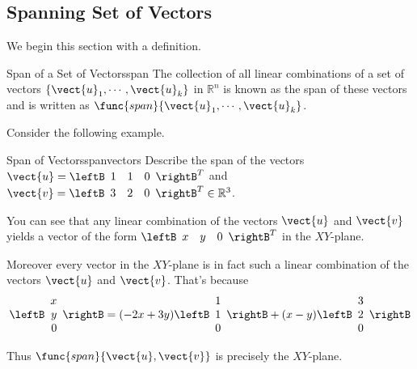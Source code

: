 \subsection{Spanning Set of Vectors}

We begin this section with a definition.

\begin{definition}{Span of a Set of Vectors}{span}
The collection of all linear combinations of a set of vectors $\{ \vect{u}_1,
\cdots ,\vect{u}_k\}$ in $\mathbb{R}^{n}$ is known as the span of these
vectors and is written as $\func{span} \{\vect{u}_1, \cdots , \vect{u}_k\}$.
 
\end{definition}

Consider the following example.

\begin{example}{Span of Vectors}{spanvectors}
Describe the span of the vectors $\vect{u}=\leftB 
\begin{array}{rrr}
1  & 1 & 0
\end{array}
\rightB^T$ and
$\vect{v}=\leftB 
\begin{array}{rrr}
3  & 2 & 0
\end{array}
\rightB^T \in \mathbb{R}^{3}$.
\end{example}

\begin{solution}
You can see that any linear combination of the vectors $\vect{u}$ and $\vect{v}$ yields a vector of the form 
$\leftB 
\begin{array}{rrr}
x  & y & 0
\end{array}
\rightB^T$ in the $XY$-plane. 

Moreover every vector in the $XY$-plane is in fact such a linear
combination of the vectors $\vect{u}$ and $\vect{v}$. That's because
\[ \leftB 
\begin{array}{r}
x \\
y \\
 0
\end{array}
\rightB 
=
(-2x+3y) \leftB 
\begin{array}{r}
1  \\
1 \\
0
\end{array}
\rightB
+
(x-y)\leftB 
\begin{array}{r}
3 \\
2 \\
0
\end{array}
\rightB 
\]

Thus  $\func{span}\{\vect{u},\vect{v}\}$ is precisely the $XY$-plane.
\end{solution}

